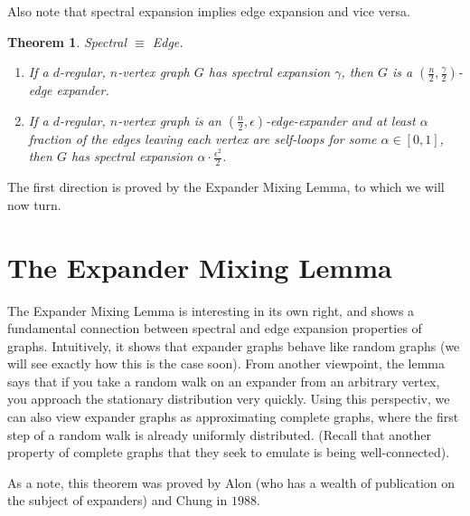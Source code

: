 \documentclass[11pt]{article}
\newtheorem{theorem}{Theorem}[section]
\theoremstyle{definition}
\theoremstyle{definition}
\theoremstyle{definition}
\begin{document}
Also note that spectral expansion implies edge expansion and vice versa.
\begin{theorem} Spectral $\equiv$ Edge. \\
\begin{enumerate}

\item If a $d$-regular, $n$-vertex graph $G$ has spectral expansion $\gamma$, then $G$ is a $(\frac{n}{2}, \frac{\gamma}{2})$-edge expander.

\item If a $d$-regular, $n$-vertex graph is an $(\frac{n}{2}, \epsilon)$-edge-expander and at least $\alpha$ fraction of the edges leaving each vertex are self-loops for some $\alpha \in [0, 1]$, then $G$ has spectral expansion $\alpha \cdot \frac{\epsilon^2}{2}$. 

\end{enumerate}
\end{theorem}

The first direction is proved by the Expander Mixing Lemma, to which we will now turn. 


\section{The Expander Mixing Lemma}

The Expander Mixing Lemma is interesting in its own right, and shows a fundamental connection between spectral and edge expansion properties of graphs. Intuitively, it shows that expander graphs behave like random graphs (we will see exactly how this is the case soon). From another viewpoint, the lemma says that if you take a random walk on an expander from an arbitrary vertex, you approach the stationary distribution very quickly. Using this perspectiv, we can also view expander graphs as approximating complete graphs, where the first step of a random walk is already uniformly distributed. (Recall that another property of complete graphs that they seek to emulate is being well-connected).

As a note, this theorem was proved by Alon (who has a wealth of publication on the subject of expanders) and Chung in $1988$.  
\end{document}
